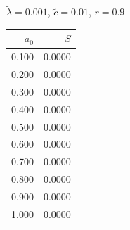 \documentclass[11pt,a4paper,dvipsnames,twosided]{article}
\begin{document}
\begin{minipage}[t]{\textwidth}
\begin{minipage}[t]{0.32\textwidth}
        \footnotesize
        \begin{flushleft}$\tilde{\lambda}=0.001$, $\tilde{c}=0.01$, $r=0.9$\end{flushleft}
        \begin{tabular}[t]{rr}
            $a_0$ & $S$ \\
            \hline
             0.100 & 0.0000 \\
             0.200 & 0.0000 \\
             0.300 & 0.0000 \\
             0.400 & 0.0000 \\
             0.500 & 0.0000 \\
             0.600 & 0.0000 \\
             0.700 & 0.0000 \\
             0.800 & 0.0000 \\
             0.900 & 0.0000 \\
             1.000 & 0.0000 \\
        \end{tabular}
    \end{minipage}
\end{minipage}
\end{document}
